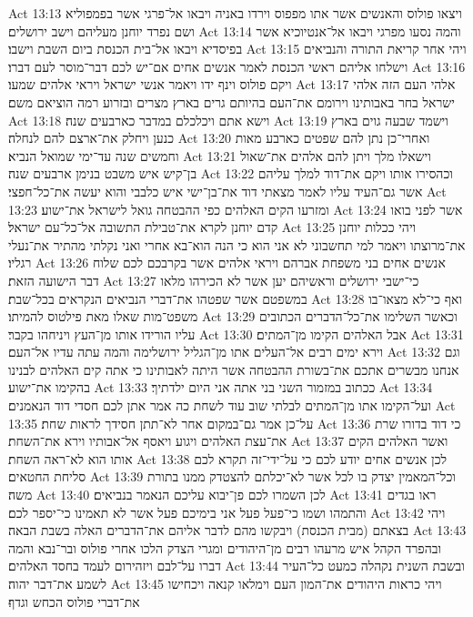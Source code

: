 Act 13:13  ויצאו פולוס והאנשים אשר אתו מפפוס וירדו באניה ויבאו אל־פרגי אשר בפמפוליא ושם נפרד יוחנן מעליהם וישב ירושלים׃
Act 13:14  והמה נסעו מפרגי ויבאו אל־אנטיוכיא אשר בפיסדיא ויבאו אל־בית הכנסת ביום השבת וישבו׃
Act 13:15  ויהי אחר קריאת התורה והנביאים וישלחו אליהם ראשי הכנסת לאמר אנשים אחים אם־יש לכם דבר־מוסר לעם דברו׃
Act 13:16  ויקם פולוס וינף ידו ויאמר אנשי ישראל ויראי אלהים שמעו׃
Act 13:17  אלהי העם הזה אלהי ישראל בחר באבותינו וירומם את־העם בהיותם גרים בארץ מצרים ובזרוע רמה הוציאם משם׃
Act 13:18  וישא אתם ויכלכלם במדבר כארבעים שנה׃
Act 13:19  וישמד שבעה גוים בארץ כנען ויחלק את־ארצם להם לנחלה׃
Act 13:20  ואחרי־כן נתן להם שפטים כארבע מאות וחמשים שנה עד־ימי שמואל הנביא׃
Act 13:21  וישאלו מלך ויתן להם אלהים את־שאול בן־קיש איש משבט בנימן ארבעים שנה׃
Act 13:22  וכהסירו אותו ויקם את־דוד למלך עליהם אשר גם־העיד עליו לאמר מצאתי דוד את־בן־ישי איש כלבבי והוא יעשה את־כל־חפצי׃
Act 13:23  ומזרעו הקים האלהים כפי ההבטחה גואל לישראל את־ישוע׃
Act 13:24  אשר לפני בואו קדם יוחנן לקרא את־טבילת התשובה אל־כל־עם ישראל׃
Act 13:25  ויהי ככלות יוחנן את־מרוצתו ויאמר למי תחשבוני לא אני הוא כי הנה הוא־בא אחרי ואני נקלתי מהתיר את־נעלי רגליו׃
Act 13:26  אנשים אחים בני משפחת אברהם ויראי אלהים אשר בקרבכם לכם שלוח דבר הישועה הזאת׃
Act 13:27  כי־ישבי ירושלים וראשיהם יען אשר לא הכירהו מלאו במשפטם אשר שפטהו את־דברי הנביאים הנקראים בכל־שבת׃
Act 13:28  ואף כי־לא מצאו־בו משפט־מות שאלו מאת פילטוס להמיתו׃
Act 13:29  וכאשר השלימו את־כל־הדברים הכתובים עליו הורידו אותו מן־העץ ויניחהו בקבר׃
Act 13:30  אבל האלהים הקימו מן־המתים׃
Act 13:31  וירא ימים רבים אל־העלים אתו מן־הגליל ירושלימה והמה עתה עדיו אל־העם׃
Act 13:32  וגם אנחנו מבשרים אתכם את־בשורת ההבטחה אשר היתה לאבותינו כי אתה קים האלהים לבנינו בהקימו את־ישוע׃
Act 13:33  ככתוב במזמור השני בני אתה אני היום ילדתיך׃
Act 13:34  ועל־הקימו אתו מן־המתים לבלתי שוב עוד לשחת כה אמר אתן לכם חסדי דוד הנאמנים׃
Act 13:35  על־כן אמר גם־במקום אחר לא־תתן חסידך לראות שחת׃
Act 13:36  כי דוד בדורו שרת את־עצת האלהים ויגוע ויאסף אל־אבותיו וירא את־השחת׃
Act 13:37  ואשר האלהים הקים אותו הוא לא־ראה השחת׃
Act 13:38  לכן אנשים אחים יודע לכם כי על־ידי־זה תקרא לכם סליחת החטאים׃
Act 13:39  וכל־המאמין יצדק בו לכל אשר לא־יכלתם להצטדק ממנו בתורת משה׃
Act 13:40  לכן השמרו לכם פן־יבוא עליכם הנאמר בנביאים׃
Act 13:41  ראו בגדים והתמהו ושמו כי־פעל פעל אני בימיכם פעל אשר לא תאמינו כי־יספר לכם׃
Act 13:42  ויהי בצאתם (מבית הכנסת) ויבקשו מהם לדבר אליהם את־הדברים האלה בשבת הבאה׃
Act 13:43  ובהפרד הקהל איש מרעהו רבים מן־היהודים ומגרי הצדק הלכו אחרי פולוס ובר־נבא והמה דברו על־לבם ויזהירום לעמד בחסד האלהים׃
Act 13:44  ובשבת השנית נקהלה כמעט כל־העיר לשמע את־דבר יהוה׃
Act 13:45  ויהי כראות היהודים את־המון העם וימלאו קנאה ויכחישו את־דברי פולוס הכחש וגדף׃
